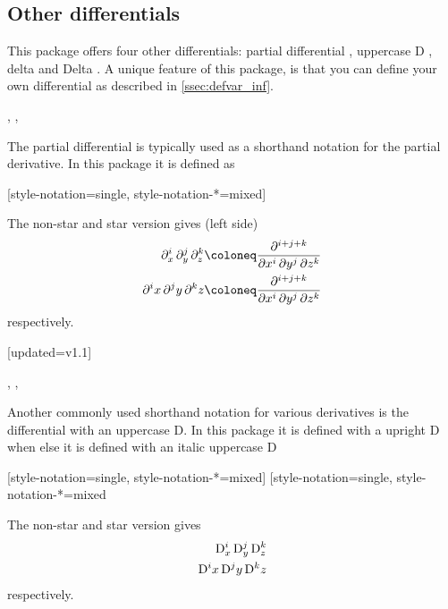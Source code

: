 \subsection{Other differentials}
This package offers four other differentials: partial differential \macro{\pdif}, uppercase D \macro{\mdif}, delta \macro{\fdif} and Delta \macro{\adif}. A unique feature of this package, is that you can define your own differential as described in \cref{ssec:defvar_inf}.

\begin{function}{\pdif}
	\begin{syntax}
		\sarg, , 
	\end{syntax}
	The partial differential  is typically used as a shorthand notation for the partial derivative. In this package it is defined as
	
	\begin{definition}
		\DeclareDifferential{\pdif}{\partial}[style-notation=single,
		style-notation-*=mixed]
	\end{definition}
	
	\noindent The non-star and star version gives (left side)
	\begin{align*}
		\pdif[order={i,j,k}]{x,y,z} &\coloneq \pdv[order={i,j,k}]{}{x,y,z} \\
		\pdif*[order={i,j,k}]{x,y,z} &\coloneq \pdv[order={i,j,k}]{}{x,y,z}
	\end{align*}
	respectively.
\end{function}

\begin{function}{\mdif}[updated=v1.1]
	\begin{syntax}
		\sarg, , \marg{variables}
	\end{syntax}
	Another commonly used shorthand notation for various derivatives is the differential with an uppercase D. In this package it is defined with a upright D when  else it is defined with an italic uppercase D
		
	\begin{definition}
		[style-notation=single,
		style-notation-*=mixed]%
		[style-notation=single,
		style-notation-*=mixed%
	\end{definition}
	
	\noindent The non-star and star version gives
	\begin{align*}
		\mdif[order={i,j,k}]{x,y,z} \\
		\mdif*[order={i,j,k}]{x,y,z}
	\end{align*}
	respectively.
\end{function}

